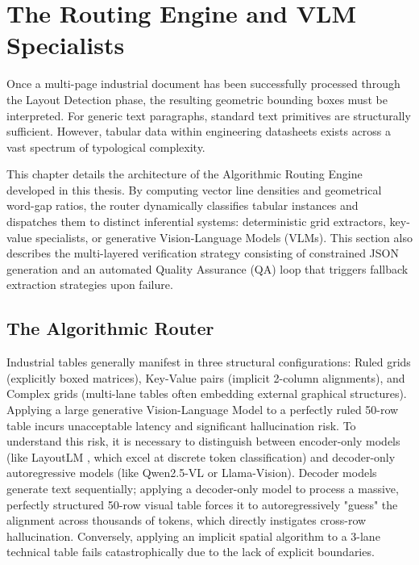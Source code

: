 \chapter{The Routing Engine and VLM Specialists}
\label{ch:routing_vlm}

Once a multi-page industrial document has been successfully processed through the Layout Detection phase, the resulting geometric bounding boxes must be interpreted. For generic text paragraphs, standard text primitives are structurally sufficient. However, tabular data within engineering datasheets exists across a vast spectrum of typological complexity. 

This chapter details the architecture of the Algorithmic Routing Engine developed in this thesis. By computing vector line densities and geometrical word-gap ratios, the router dynamically classifies tabular instances and dispatches them to distinct inferential systems: deterministic grid extractors, key-value specialists, or generative Vision-Language Models (VLMs). This section also describes the multi-layered verification strategy consisting of constrained JSON generation and an automated Quality Assurance (QA) loop that triggers fallback extraction strategies upon failure.

\section{The Algorithmic Router}
\label{sec:router_logic}

Industrial tables generally manifest in three structural configurations: Ruled grids (explicitly boxed matrices), Key-Value pairs (implicit 2-column alignments), and Complex grids (multi-lane tables often embedding external graphical structures). Applying a large generative Vision-Language Model to a perfectly ruled 50-row table incurs unacceptable latency and significant hallucination risk. To understand this risk, it is necessary to distinguish between encoder-only models (like LayoutLM \citep{layoutlmv3}, which excel at discrete token classification) and decoder-only autoregressive models (like Qwen2.5-VL or Llama-Vision). Decoder models generate text sequentially; applying a decoder-only model to process a massive, perfectly structured 50-row visual table forces it to autoregressively "guess" the alignment across thousands of tokens, which directly instigates cross-row hallucination. Conversely, applying an implicit spatial algorithm to a 3-lane technical table fails catastrophically due to the lack of explicit boundaries.

